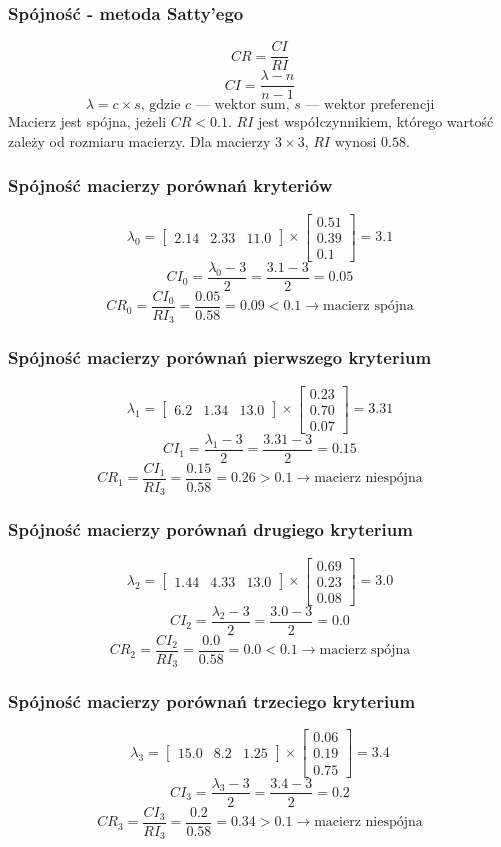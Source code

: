 \documentclass{beamer}
\begin{document}
\begin{frame}
\frametitle{Spójność - metoda Satty'ego}
$$CR=\frac{CI}{RI}$$
$$CI=\frac{\lambda-n}{n-1}$$
$$\lambda=c \times s\textrm{, gdzie } c \textrm{ --- wektor sum, } s \textrm{ --- wektor preferencji}$$
Macierz jest spójna, jeżeli $CR < 0.1$.
$RI$ jest współczynnikiem, którego wartość zależy od rozmiaru macierzy.
Dla macierzy $3 \times 3$, $RI$ wynosi $0.58$.
\end{frame}

\begin{frame}
\frametitle{Spójność macierzy porównań kryteriów}
$$\lambda_0=\left[\begin{array}{ccc}2.14 & 2.33 & 11.0\end{array}\right]\times\left[\begin{array}{c}0.51\\0.39\\0.1\end{array}\right]=3.1$$
$$CI_0=\frac{\lambda_0-3}{2}=\frac{3.1-3}{2}=0.05$$
$$CR_0=\frac{CI_0}{RI_3}=\frac{0.05}{0.58}=0.09 < 0.1 \rightarrow\textrm{macierz spójna}$$
\end{frame}

\begin{frame}
\frametitle{Spójność macierzy porównań pierwszego kryterium}
$$\lambda_1=\left[\begin{array}{ccc}6.2 & 1.34 & 13.0\end{array}\right]\times\left[\begin{array}{c}0.23\\0.70\\0.07\end{array}\right]=3.31$$
$$CI_1=\frac{\lambda_1-3}{2}=\frac{3.31-3}{2}=0.15$$
$$CR_1=\frac{CI_1}{RI_3}=\frac{0.15}{0.58}=0.26 > 0.1 \rightarrow\textrm{macierz niespójna}$$
\end{frame}

\begin{frame}
\frametitle{Spójność macierzy porównań drugiego kryterium}
$$\lambda_2=\left[\begin{array}{ccc}1.44 & 4.33 & 13.0\end{array}\right]\times\left[\begin{array}{c}0.69\\0.23\\0.08\end{array}\right]=3.0$$
$$CI_2=\frac{\lambda_2-3}{2}=\frac{3.0-3}{2}=0.0$$
$$CR_2=\frac{CI_2}{RI_3}=\frac{0.0}{0.58}=0.0 < 0.1 \rightarrow\textrm{macierz spójna}$$
\end{frame}

\begin{frame}
\frametitle{Spójność macierzy porównań trzeciego kryterium}
$$\lambda_3=\left[\begin{array}{ccc}15.0 & 8.2 & 1.25\end{array}\right]\times\left[\begin{array}{c}0.06\\0.19\\0.75\end{array}\right]=3.4$$
$$CI_3=\frac{\lambda_3-3}{2}=\frac{3.4-3}{2}=0.2$$
$$CR_3=\frac{CI_3}{RI_3}=\frac{0.2}{0.58}=0.34 > 0.1 \rightarrow\textrm{macierz niespójna}$$
\end{frame}
\end{document}
